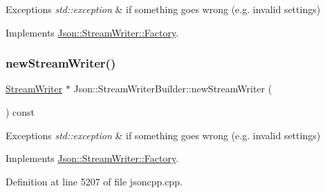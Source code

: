 \begin{DoxyExceptions}{Exceptions}
{\em std\+::exception} & if something goes wrong (e.\+g. invalid settings) \\
\hline
\end{DoxyExceptions}


Implements \hyperlink{class_json_1_1_stream_writer_1_1_factory_a9d30ec53e8288cd53befccf1009c5f31}{Json\+::\+Stream\+Writer\+::\+Factory}.

\hypertarget{class_json_1_1_stream_writer_builder_ab9ee278609f88ae04a7c1a84e1f559e6}{}\label{class_json_1_1_stream_writer_builder_ab9ee278609f88ae04a7c1a84e1f559e6} 
\subsubsection{\texorpdfstring{new\+Stream\+Writer()}{newStreamWriter()}\hspace{0.1cm}{\footnotesize\ttfamily [2/2]}}
{\footnotesize\ttfamily \hyperlink{class_json_1_1_stream_writer}{Stream\+Writer} $\ast$ Json\+::\+Stream\+Writer\+Builder\+::new\+Stream\+Writer (\begin{DoxyParamCaption}{ }\end{DoxyParamCaption}) const\hspace{0.3cm}{\ttfamily [virtual]}}


\begin{DoxyExceptions}{Exceptions}
{\em std\+::exception} & if something goes wrong (e.\+g. invalid settings) \\
\hline
\end{DoxyExceptions}


Implements \hyperlink{class_json_1_1_stream_writer_1_1_factory_a9d30ec53e8288cd53befccf1009c5f31}{Json\+::\+Stream\+Writer\+::\+Factory}.



Definition at line 5207 of file jsoncpp.\+cpp.

\hypertarget{class_json_1_1_stream_writer_builder_abce904d1b84cf8bda730824e3843decb}{}\label{class_json_1_1_stream_writer_builder_abce904d1b84cf8bda730824e3843decb} 
